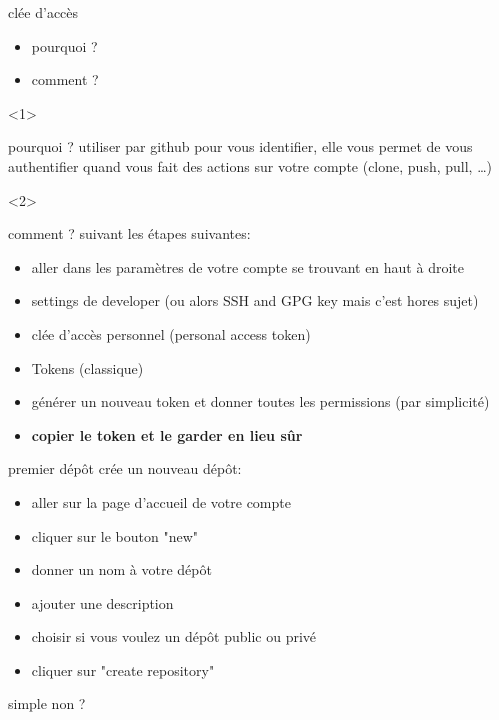 \documentclass[usenames,dvipsnames]{beamer}
\begin{document}
\begin{frame}[fragile]{clée d'accès}
	\begin{itemize}
		\item<1-> pourquoi ?
		\item<2-> comment ?
	\end{itemize}
	\begin{onlyenv}
		\begin{block}{pourquoi ?}
			utiliser par github pour vous identifier, elle vous permet de vous authentifier quand vous fait des actions sur votre compte (clone, push, pull, \dots)
		\end{block}
	\end{onlyenv}
	\begin{onlyenv}
		\begin{block}{comment ?}
			suivant les étapes suivantes:
			\begin{itemize}
				\item aller dans les paramètres de votre compte se trouvant en haut à droite
				\item settings de developer (ou alors SSH and GPG key mais c'est hores sujet)
				\item clée d'accès personnel (personal access token) 
				\item Tokens (classique)
				\item générer un nouveau token et donner toutes les permissions (par simplicité)
				\item \textbf{copier le token et le garder en lieu sûr}
			\end{itemize}
		\end{block}
	\end{onlyenv}
\end{frame}

\begin{frame}[fragile]{premier dépôt}
	crée un nouveau dépôt:
	\begin{itemize}
		\item aller sur la page d'accueil de votre compte
		\item cliquer sur le bouton "new"
		\item donner un nom à votre dépôt
		\item ajouter une description
		\item choisir si vous voulez un dépôt public ou privé
		\item cliquer sur "create repository"
	\end{itemize}
	simple non ?
\end{frame}
\end{document}
